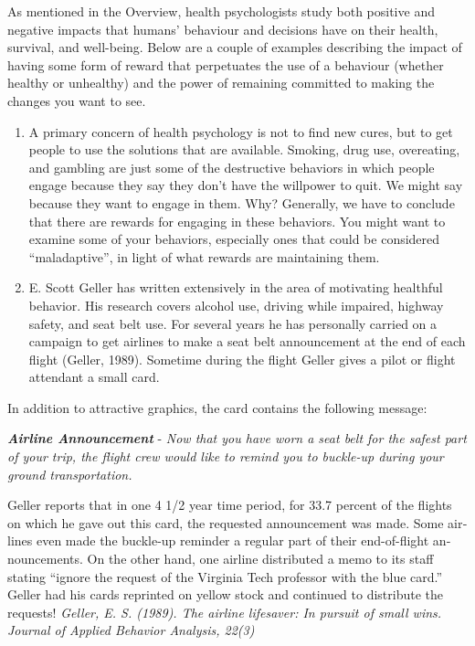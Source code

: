 \documentclass[
]{book}
\begin{document}
As mentioned in the Overview, health psychologists study both positive and negative impacts that humans' behaviour and decisions have on their health, survival, and well-being. Below are a couple of examples describing the impact of having some form of reward that perpetuates the use of a behaviour (whether healthy or unhealthy) and the power of remaining committed to making the changes you want to see.

\begin{enumerate}
\def\labelenumi{\arabic{enumi}.}
\item
  A primary concern of health psychology is not to find new cures, but to get peo­ple to use the solutions that are available. Smoking, drug use, overeating, and gambling are just some of the destructive behaviors in which people engage be­cause they say they don't have the willpower to quit. We might say because they want to engage in them. Why? Generally, we have to conclude that there are rewards for engaging in these behaviors. You might want to examine some of your behaviors, especially ones that could be considered ``maladaptive'', in light of what rewards are maintaining them.
\item
  E. Scott Geller has written extensively in the area of motivating healthful behav­ior. His research covers alcohol use, driving while impaired, highway safety, and seat belt use. For several years he has personally carried on a campaign to get air­lines to make a seat belt announcement at the end of each flight (Geller, 1989). Sometime during the flight Geller gives a pilot or flight attendant a small card.
\end{enumerate}

In addition to attractive graphics, the card contains the following message:

\textbf{\emph{Airline Announcement}} - \emph{Now that you have worn a seat belt for the safest part of your trip, the flight crew would like to remind you to buckle-up during your ground transportation.}

Geller reports that in one 4 1/2 year time period, for 33.7 percent of the flights on which he gave out this card, the requested announcement was made. Some air­lines even made the buckle-up reminder a regular part of their end-of-flight an­nouncements. On the other hand, one airline distributed a memo to its staff stating ``ignore the request of the Virginia Tech professor with the blue card.'' Geller had his cards reprinted on yellow stock and continued to distribute the requests! \emph{Geller, E. S. (1989). The airline lifesaver: In pursuit of small wins. Journal of Applied Behavior Analysis, 22(3)}
\end{document}

